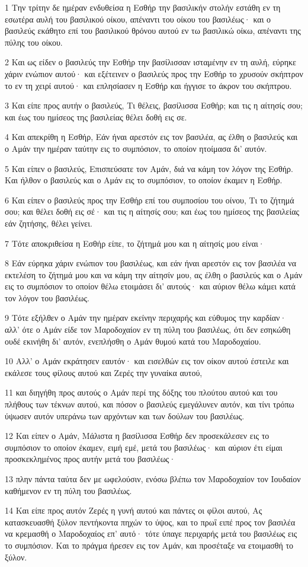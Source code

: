 \par 1 Την τρίτην δε ημέραν ενδυθείσα η Εσθήρ την βασιλικήν στολήν εστάθη εν τη εσωτέρα αυλή του βασιλικού οίκου, απέναντι του οίκου του βασιλέως· και ο βασιλεύς εκάθητο επί του βασιλικού θρόνου αυτού εν τω βασιλικώ οίκω, απέναντι της πύλης του οίκου.
\par 2 Και ως είδεν ο βασιλεύς την Εσθήρ την βασίλισσαν ισταμένην εν τη αυλή, εύρηκε χάριν ενώπιον αυτού· και εξέτεινεν ο βασιλεύς προς την Εσθήρ το χρυσούν σκήπτρον το εν τη χειρί αυτού· και επλησίασεν η Εσθήρ και ήγγισε το άκρον του σκήπτρου.
\par 3 Και είπε προς αυτήν ο βασιλεύς, Τι θέλεις, βασίλισσα Εσθήρ; και τις η αίτησίς σου; και έως του ημίσεος της βασιλείας θέλει δοθή εις σε.
\par 4 Και απεκρίθη η Εσθήρ, Εάν ήναι αρεστόν εις τον βασιλέα, ας έλθη ο βασιλεύς και ο Αμάν την ημέραν ταύτην εις το συμπόσιον, το οποίον ητοίμασα δι' αυτόν.
\par 5 Και είπεν ο βασιλεύς, Επισπεύσατε τον Αμάν, διά να κάμη τον λόγον της Εσθήρ. Και ήλθον ο βασιλεύς και ο Αμάν εις το συμπόσιον, το οποίον έκαμεν η Εσθήρ.
\par 6 Και είπεν ο βασιλεύς προς την Εσθήρ επί του συμποσίου του οίνου, Τι το ζήτημά σου; και θέλει δοθή εις σέ· και τις η αίτησίς σου; και έως του ημίσεος της βασιλείας εάν ζητήσης, θέλει γείνει.
\par 7 Τότε αποκριθείσα η Εσθήρ είπε, το ζήτημά μου και η αίτησίς μου είναι·
\par 8 Εάν εύρηκα χάριν ενώπιον του βασιλέως, και εάν ήναι αρεστόν εις τον βασιλέα να εκτελέση το ζήτημά μου και να κάμη την αίτησίν μου, ας έλθη ο βασιλεύς και ο Αμάν εις το συμπόσιον το οποίον θέλω ετοιμάσει δι' αυτούς· και αύριον θέλω κάμει κατά τον λόγον του βασιλέως.
\par 9 Τότε εξήλθεν ο Αμάν την ημέραν εκείνην περιχαρής και εύθυμος την καρδίαν· αλλ' ότε ο Αμάν είδε τον Μαροδοχαίον εν τη πύλη του βασιλέως, ότι δεν εσηκώθη ουδέ εκινήθη δι' αυτόν, ενεπλήσθη ο Αμάν θυμού κατά του Μαροδοχαίου.
\par 10 Αλλ' ο Αμάν εκράτησεν εαυτόν· και εισελθών εις τον οίκον αυτού έστειλε και εκάλεσε τους φίλους αυτού και Ζερές την γυναίκα αυτού,
\par 11 και διηγήθη προς αυτούς ο Αμάν περί της δόξης του πλούτου αυτού και του πλήθους των τέκνων αυτού, και πόσον ο βασιλεύς εμεγάλυνεν αυτόν, και τίνι τρόπω ύψωσεν αυτόν υπεράνω των αρχόντων και των δούλων του βασιλέως.
\par 12 Και είπεν ο Αμάν, Μάλιστα η βασίλισσα Εσθήρ δεν προσεκάλεσεν εις το συμπόσιον το οποίον έκαμεν, ειμή εμέ, μετά του βασιλέως· και αύριον έτι είμαι προσκεκλημένος προς αυτήν μετά του βασιλέως·
\par 13 πλην πάντα ταύτα δεν με ωφελούσιν, ενόσω βλέπω τον Μαροδοχαίον τον Ιουδαίον καθήμενον εν τη πύλη του βασιλέως.
\par 14 Και είπε προς αυτόν Ζερές η γυνή αυτού και πάντες οι φίλοι αυτού, Ας κατασκευασθή ξύλον πεντήκοντα πηχών το ύψος, και το πρωΐ ειπέ προς τον βασιλέα να κρεμασθή ο Μαροδοχαίος επ' αυτό· τότε ύπαγε περιχαρής μετά του βασιλέως εις το συμπόσιον. Και το πράγμα ήρεσεν εις τον Αμάν, και προσέταξε να ετοιμασθή το ξύλον.

